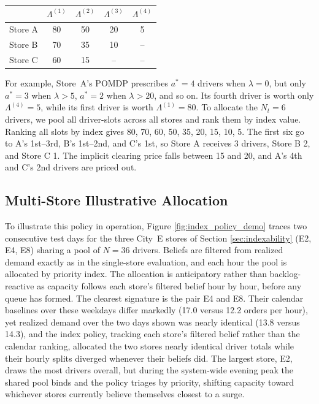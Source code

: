 \documentclass[preprint,11pt,authoryear]{elsarticle}
\theoremstyle{remark}
\begin{document}
\begin{center}
\small
\begin{tabular}{lcccc}
\toprule
& $\Lambda^{(1)}$ & $\Lambda^{(2)}$ & $\Lambda^{(3)}$ & $\Lambda^{(4)}$ \\
\midrule
Store A & 80 & 50 & 20 & 5 \\
Store B & 70 & 35 & 10 & -- \\
Store C & 60 & 15 & -- & -- \\
\bottomrule
\end{tabular}
\end{center}

\noindent For example, Store~A's POMDP prescribes $a^* = 4$ drivers when $\lambda = 0$, but only $a^* = 3$ when $\lambda > 5$, $a^* = 2$ when $\lambda > 20$, and so on. Its fourth driver is worth only $\Lambda^{(4)} = 5$, while its first driver is worth $\Lambda^{(1)} = 80$. To allocate the $N_t = 6$ drivers, we pool all driver-slots across all stores and rank them by index value. Ranking all slots by index gives 80, 70, 60, 50, 35, 20, 15, 10, 5. The first six go to A’s 1st–3rd, B’s 1st–2nd, and C’s 1st, so Store A receives 3 drivers, Store B 2, and Store C 1. The implicit clearing price falls between 15 and 20, and A’s 4th and C’s 2nd drivers are priced out.


\subsection{Multi-Store Illustrative Allocation}
\label{sec:multi_store_results}

To illustrate this policy in operation, Figure \ref{fig:index_policy_demo} traces two consecutive test days for the three City~E stores of Section \ref{sec:indexability} (E2, E4, E8) sharing a pool of $N = 36$ drivers. Beliefs are filtered from realized demand exactly as in the single-store evaluation, and each hour the pool is allocated by priority index. The allocation is anticipatory rather than backlog-reactive as capacity follows each store's filtered belief hour by hour, before any queue has formed. The clearest signature is the pair E4 and E8. Their calendar baselines over these weekdays differ markedly (17.0 versus 12.2 orders per hour), yet realized demand over the two days shown was nearly identical (13.8 versus 14.3), and the index policy, tracking each store's filtered belief rather than the calendar ranking, allocated the two stores nearly identical driver totals while their hourly splits diverged whenever their beliefs did. The largest store, E2, draws the most drivers overall, but during the system-wide evening peak the shared pool binds and the policy triages by priority, shifting capacity toward whichever stores currently believe themselves closest to a surge.
\end{document}
